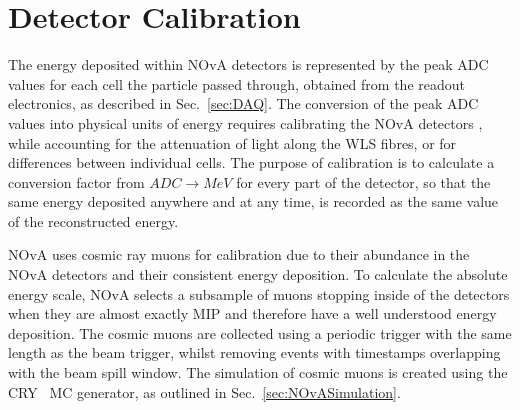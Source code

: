 \section{Detector Calibration}\label{sec:NOvACalibration}
The energy deposited within \gls{NOvA} detectors is represented by the peak \gls{ADC} values for each cell the particle passed through, obtained from the readout electronics, as described in Sec.~\ref{sec:DAQ}.
The conversion of the peak \gls{ADC} values into physical units of energy requires calibrating the \gls{NOvA} detectors \cite{PrabhjotNOvAThesis_CalibrationAndOscResults2019.pdf}, while accounting for the attenuation of light along the \gls{WLS} fibres, or for differences between individual cells. The purpose of calibration is to calculate a conversion factor from $\unit{ADC}\rightarrow\unit{MeV}$ for every part of the detector, so that the same energy deposited anywhere and at any time, is recorded as the same value of the reconstructed energy.



\gls{NOvA} uses cosmic ray muons for calibration due to their abundance in the \gls{NOvA} detectors and their consistent energy deposition. To calculate the absolute energy scale, \gls{NOvA} selects a subsample of muons stopping inside of the detectors when they are almost exactly \gls{MIP} and therefore have a well understood energy deposition. The cosmic muons are collected using a periodic trigger with the same length as the beam trigger, whilst removing events with timestamps overlapping with the beam spill window. The simulation of cosmic muons is created using the \gls{CRY}~\cite{CRY} \gls{MC} generator, as outlined in Sec.~\ref{sec:NOvASimulation}.

